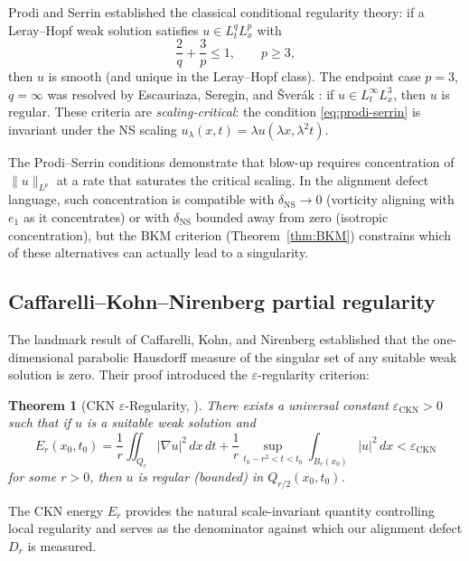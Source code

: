 \documentclass[11pt]{article}
\newtheorem{theorem}{Theorem}[section]
\theoremstyle{definition}
\theoremstyle{remark}
\newcommand{\eps}{\varepsilon}
\begin{document}
Prodi \cite{ProdiSerrin} and Serrin \cite{Serrin} established the classical
conditional regularity theory: if a Leray--Hopf weak solution satisfies
$u \in L^q_t L^p_x$ with
\begin{equation}\label{eq:prodi-serrin}
  \frac{2}{q} + \frac{3}{p} \leq 1, \qquad p \geq 3,
\end{equation}
then $u$ is smooth (and unique in the Leray--Hopf class).  The endpoint case
$p = 3$, $q = \infty$ was resolved by Escauriaza, Seregin, and \v{S}ver\'ak
\cite{ESS}: if $u \in L^\infty_t L^3_x$, then $u$ is regular.  These criteria
are \emph{scaling-critical}: the condition \eqref{eq:prodi-serrin} is invariant
under the NS scaling $u_\lambda(x,t) = \lambda u(\lambda x, \lambda^2 t)$.

The Prodi--Serrin conditions demonstrate that blow-up requires concentration of
$\|u\|_{L^p}$ at a rate that saturates the critical scaling.  In the alignment
defect language, such concentration is compatible with $\delta_{\mathrm{NS}} \to 0$
(vorticity aligning with $e_1$ as it concentrates) or with $\delta_{\mathrm{NS}}$
bounded away from zero (isotropic concentration), but the BKM criterion
(Theorem~\ref{thm:BKM}) constrains which of these alternatives can actually lead
to a singularity.

\subsection{Caffarelli--Kohn--Nirenberg partial regularity}

The landmark result of Caffarelli, Kohn, and Nirenberg \cite{CKN} established that
the one-dimensional parabolic Hausdorff measure of the singular set of any suitable
weak solution is zero.  Their proof introduced the $\eps$-regularity criterion:

\begin{theorem}[CKN $\eps$-Regularity, {\cite{CKN}}]
\label{thm:CKN}
There exists a universal constant $\eps_{\mathrm{CKN}} > 0$ such that if $u$ is a
suitable weak solution and
\[
  E_r(x_0, t_0) = \frac{1}{r}\iint_{Q_r} |\nabla u|^2\, dx\, dt
  + \frac{1}{r}\sup_{t_0 - r^2 < t < t_0}\int_{B_r(x_0)} |u|^2\, dx
  < \eps_{\mathrm{CKN}}
\]
for some $r > 0$, then $u$ is regular (bounded) in $Q_{r/2}(x_0, t_0)$.
\end{theorem}

The CKN energy $E_r$ provides the natural scale-invariant quantity controlling
local regularity and serves as the denominator against which our alignment defect
$D_r$ is measured.
\end{document}
